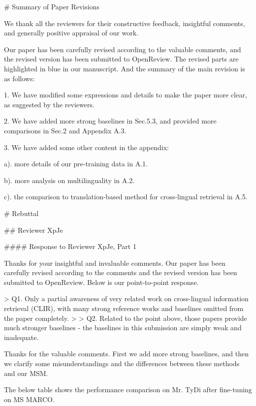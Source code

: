 # Summary of Paper Revisions

We thank all the reviewers for their constructive feedback, insightful comments, and generally positive appraisal of our work. 

Our paper has been carefully revised according to the valuable comments, and the revised version has been submitted to OpenReview. The revised parts are highlighted in blue in our manuscript.  And the summary of the main revision is as follows:

1. We have modified some expressions and details to make the paper more clear, as suggested by the reviewers.

2. We have added more strong baselines in Sec.5.3, and provided more comparisons in Sec.2 and Appendix A.3.

3. We have added some other content in the appendix:

   a). more details of our pre-training data in A.1. 

   b). more analysis on multilinguality in A.2.

   c). the comparison to translation-based method for cross-lingual retrieval in A.5.

   



# Rebuttal



## Reviewer XpJe

#### Response to Reviewer XpJe, Part 1

Thanks for your insightful and invaluable comments. Our paper has been carefully revised according to the comments and the revised version has been submitted to OpenReview. Below is our point-to-point response.

> Q1. Only a partial awareness of very related work on cross-lingual information retrieval (CLIR), with many strong reference works and baselines omitted from the paper completely.
>
> Q2.  Related to the point above, those papers provide much stronger baselines - the baselines in this submission are simply weak and inadequate.

Thanks for the valuable comments. First we add more strong baselines, and then we clarify some misunderstandings and the differences between these methods and our MSM. 

The below table shows the performance comparison on Mr. TyDi after fine-tuning on MS MARCO.

